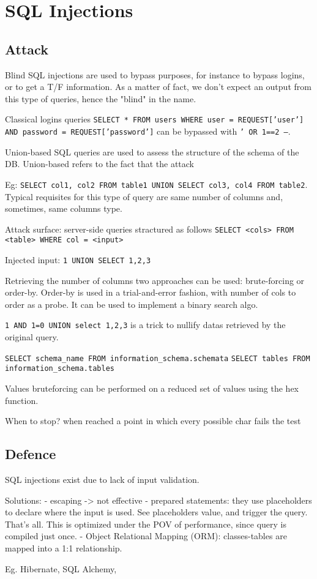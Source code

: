 \chapter{SQL Injections}
\section{Attack}
Blind SQL injections are used to bypass purposes, for instance to bypass logins, or to get a T/F information.
As a matter of fact, we don't expect an output from this type of queries, hence the "blind" in the name.

Classical logins queries \texttt{SELECT * FROM users WHERE user = REQUEST['user'] AND password = REQUEST['password']} can be bypassed with \texttt{' OR 1==2 --}.

Union-based SQL queries are used to assess the structure of the schema of the DB.
Union-based refers to the fact that the attack 

Eg: \texttt{SELECT col1, col2 FROM table1 UNION SELECT col3, col4 FROM table2}.
Typical requisites for this type of query are same number of columns and, sometimes, same columns type.

Attack surface: server-side queries stractured as follows \texttt{SELECT <cols> FROM <table> WHERE col = <input>}

Injected input: \texttt{1 UNION SELECT 1,2,3} 

Retrieving the number of columns two approaches can be used: brute-forcing or order-by.
Order-by is used in a trial-and-error fashion, with number of cols to order as a probe.
It can be used to implement a binary search algo.

\texttt{1 AND 1=0 UNION select 1,2,3} is a trick to nullify datas retrieved by the original query.

\texttt{SELECT schema_name FROM information_schema.schemata}
\texttt{SELECT tables FROM information_schema.tables}

Values bruteforcing can be performed on a reduced set of values using the hex function.

When to stop? when reached a point in which every possible char fails the test

\section{Defence}
SQL injections exist due to lack of input validation.

Solutions:
 - escaping -> not effective
 - prepared statements: they use placeholders to declare where the input is used. See placeholders value, and trigger the query. That's all. This is optimized under the POV of performance, since query is compiled just once.
 - Object Relational Mapping (ORM): classes-tables are mapped into a 1:1 relationship.

Eg. Hibernate, SQL Alchemy,